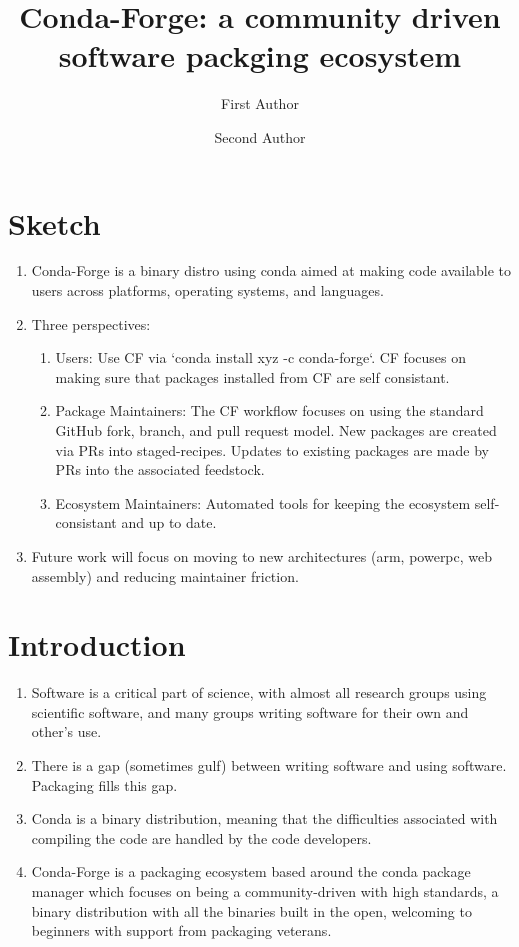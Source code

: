 \documentclass[fleqn,10pt,lineno]{wlpeerj} %
\title{Conda-Forge: a community driven software packging ecosystem}
\author[1]{First Author}
\author[2]{Second Author}
\affil[1]{Address of first author}
\affil[2]{Address of second author}
\begin{document}
\flushbottom
\maketitle
\thispagestyle{empty}


\section*{Sketch}
\begin{enumerate}
\item Conda-Forge is a binary distro using conda aimed at making code 
available to users across platforms, operating systems, and languages.
\item Three perspectives:
\begin{enumerate}
\item Users: Use CF via `conda install xyz -c conda-forge`. CF focuses
on making sure that packages installed from CF are self consistant.
\item Package Maintainers: The CF workflow focuses on using the standard 
GitHub fork, branch, and pull request model. New packages are created via 
PRs into staged-recipes. Updates to existing packages are made by PRs into 
the associated feedstock.
\item Ecosystem Maintainers: Automated tools for keeping the ecosystem
self-consistant and up to date.
\end{enumerate}
\item Future work will focus on moving to new architectures (arm, powerpc,
web assembly) and reducing maintainer friction.
\end{enumerate}


\section*{Introduction}
\begin{enumerate}
\item Software is a critical part of science, with almost all research groups
using scientific software, and many groups writing software for their own and
other's use.
\item There is a gap (sometimes gulf) between writing software and using 
software. Packaging fills this gap.
\item Conda is a binary distribution, meaning that the difficulties associated
with compiling the code are handled by the code developers.
\item Conda-Forge is a packaging ecosystem based around the conda package 
manager which focuses on being a community-driven with high standards, a binary 
distribution with all the binaries built in the open, welcoming to beginners 
with support from packaging veterans.
\end{enumerate}
\end{document}
